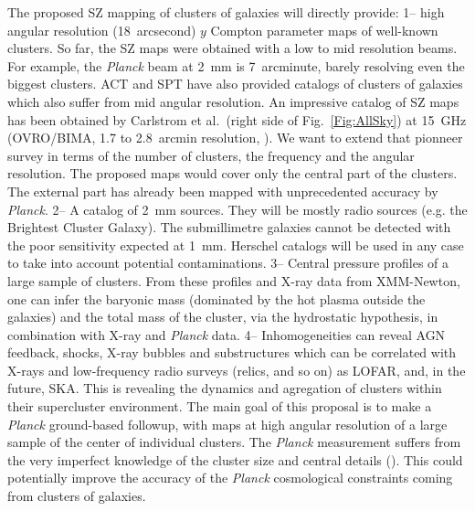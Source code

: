 \documentclass[10pt,a4paper,twoside,graphicx,color]{article}
\begin{document}
\vspace{-0.1cm}  The
proposed SZ mapping of clusters of galaxies will directly provide: 1--
high angular resolution (18~arcsecond) $y$ Compton parameter maps of
well-known clusters. So far, the SZ maps were obtained with a low to
mid resolution beams. For example, the {\sl Planck} beam at 2~mm is
7~arcminute, barely resolving even the biggest clusters. ACT and SPT
have also provided catalogs of clusters of galaxies which also suffer
from mid angular resolution. An impressive catalog of SZ maps has been
obtained by Carlstrom et al.~(right side of Fig.~\ref{Fig:AllSky}) at
15~GHz (OVRO/BIMA, 1.7 to 2.8~arcmin resolution, \cite{Reese2002}). We
want to extend that pionneer survey in terms of the number of
clusters, the frequency and the angular resolution. The proposed maps
would cover only the central part of the clusters. The external part
has already been mapped with unprecedented accuracy by {\sl
  Planck}. 2-- A catalog of 2~mm sources. They will be mostly radio
sources (e.g. the Brightest Cluster Galaxy). The submillimetre
galaxies cannot be detected with the poor sensitivity expected at
1~mm. Herschel catalogs will be used in any case to take into account
potential contaminations. 3-- Central pressure profiles of a large
sample of clusters. From these profiles and X-ray data from
XMM-Newton, one can infer the baryonic mass (dominated by the hot
plasma outside the galaxies) and the total mass of the cluster, via
the hydrostatic hypothesis, in combination with X-ray and {\sl Planck}
data. 4-- Inhomogeneities can reveal AGN feedback, shocks, X-ray bubbles and
substructures which can be correlated with X-rays and low-frequency
radio surveys (relics, and so on) as LOFAR, and, in the future,
SKA. This is revealing the dynamics and agregation of clusters within
their supercluster environment. The main goal of this proposal is to
make a {\sl Planck} ground-based followup, with maps at high angular
resolution of a large sample of the center of individual clusters. The
{\sl Planck} measurement suffers from the very imperfect knowledge of
the cluster size and central details
(\cite{Planck2013PressProf}). This could potentially improve the
accuracy of the {\sl Planck} cosmological constraints coming from
clusters of galaxies.
\end{document}
